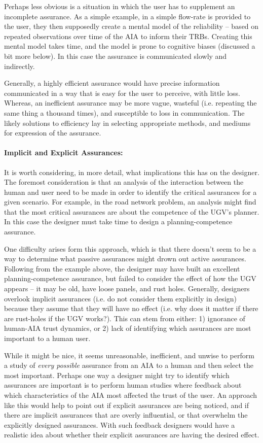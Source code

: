     Perhaps less obvious is a situation in which the user has to supplement an incomplete assurance. As a simple example, in \cite{Muir1994-ow} a simple flow-rate is provided to the user, they then supposedly create a mental model of the reliability -- based on repeated observations over time of the AIA to inform their TRBs. Creating this mental model takes time, and the model is prone to cognitive biases (discussed a bit more below). In this case the assurance is communicated slowly and indirectly.
    
    Generally, a highly efficient assurance would have precise information communicated in a way that is easy for the user to perceive, with little loss. Whereas, an inefficient assurance may be more vague, wasteful (i.e. repeating the same thing a thousand times), and susceptible to loss in communication. The likely solutions to efficiency lay in selecting appropriate methods, and mediums for expression of the assurance.

    \paragraph{Implicit and Explicit Assurances:} It is worth considering, in more detail, what implications this has on the designer. The foremost consideration is that an analysis of the interaction between the human and user need to be made in order to identify the critical assurances for a given scenario. For example, in the road network problem, an analysis might find that the most critical assurances are about the competence of the UGV's planner. In this case the designer must take time to design a planning-competence assurance.

    One difficulty arises form this approach, which is that there doesn't seem to be a way to determine what passive assurances might drown out active assurances. Following from the example above, the designer may have built an excellent planning-competence assurance, but failed to consider the effect of how the UGV appears -- it may be old, have loose panels, and rust holes. Generally, designers overlook implicit assurances (i.e. do not consider them explicitly in design) because they assume that they will have no effect (i.e. why does it matter if there are rust-holes if the UGV works?). This can stem from either: 1) ignorance of human-AIA trust dynamics, or 2) lack of identifying which assurances are most important to a human user.

    While it might be nice, it seems unreasonable, inefficient, and unwise to perform a study of \emph{every possible} assurance from an AIA to a human and then select the most important. Perhaps one way a designer might try to identify which assurances are important is to perform human studies where feedback about which characteristics of the AIA most affected the trust of the user. An approach like this would help to point out if explicit assurances are being noticed, and if there are implicit assurances that are overly influential, or that overwhelm the explicitly designed assurances. With such feedback designers would have a realistic idea about whether their explicit assurances are having the desired effect.

